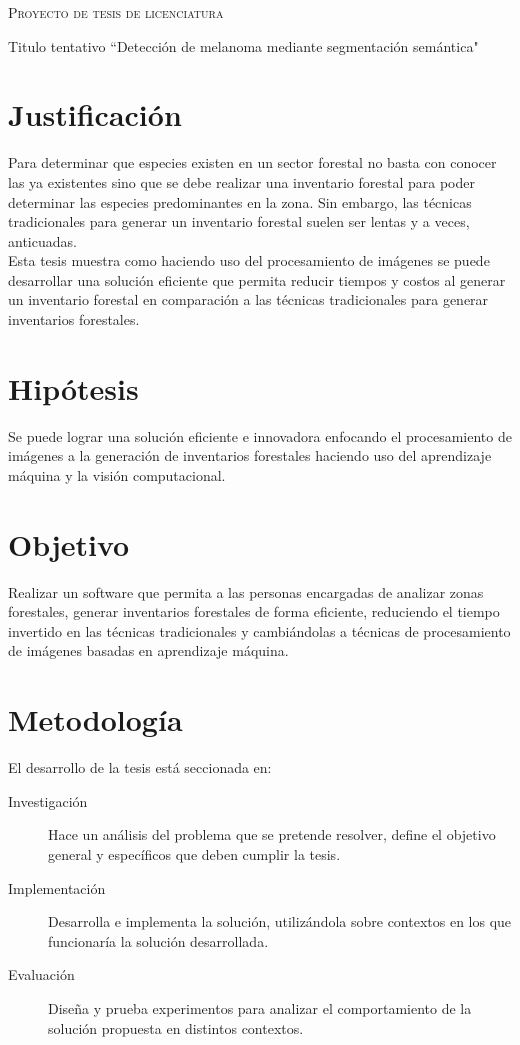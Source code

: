 \documentclass{article}
\begin{document}
\begin{center} {\scshape\LARGE Proyecto de tesis de licenciatura \par} \end{center}
Titulo tentativo   ``Detección de melanoma mediante segmentación semántica"

\section*{Justificación}
Para determinar que especies existen en un sector forestal no basta con conocer las ya existentes sino que se debe realizar una inventario forestal para poder determinar las especies predominantes en la zona. Sin embargo, las técnicas tradicionales para generar un inventario forestal suelen ser lentas y a veces, anticuadas.\newline\\
Esta tesis muestra como haciendo uso del procesamiento de imágenes se puede desarrollar una solución eficiente que permita reducir tiempos y costos al generar un inventario forestal en comparación a las técnicas tradicionales para generar inventarios forestales.

\section*{Hipótesis}
Se puede lograr una solución eficiente e innovadora enfocando el procesamiento de imágenes a la generación de inventarios forestales haciendo uso del aprendizaje máquina y la visión computacional.

\section*{Objetivo}
Realizar un software que permita a las personas encargadas de analizar zonas forestales, generar inventarios forestales de forma eficiente, reduciendo el tiempo invertido en las técnicas tradicionales y cambiándolas a técnicas de procesamiento de imágenes basadas en aprendizaje máquina.

\section*{Metodología}
El desarrollo de la tesis está seccionada en:

\begin{description}
\item[Investigación]{Hace un análisis del problema que se pretende resolver, define el objetivo general y específicos que deben cumplir la tesis.}

\item[Implementación]{Desarrolla e implementa la solución, utilizándola sobre contextos en los que funcionaría la solución desarrollada. }

\item[Evaluación]{Diseña y prueba experimentos para analizar el comportamiento de la solución propuesta en distintos contextos.}

\end{description}
\end{document}
